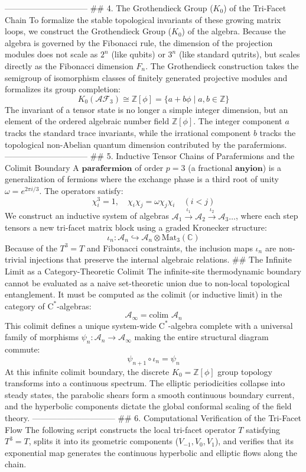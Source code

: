 ------------------------------
## 4. The Grothendieck Group ($K_0$) of the Tri-Facet Chain
To formalize the stable topological invariants of these growing matrix loops, we construct the Grothendieck Group ($K_0$) of the algebra.
Because the algebra is governed by the Fibonacci rule, the dimension of the projection modules does not scale as $2^n$ (like qubits) or $3^n$ (like standard qutrits), but scales directly as the Fibonacci dimension $F_n$.
The Grothendieck construction takes the semigroup of isomorphism classes of finitely generated projective modules and formalizes its group completion:
$$K_0(\mathcal{AF}_3) \cong \mathbb{Z}[\phi] = \{ a + b\phi \mid a, b \in \mathbb{Z} \}$$ 
The invariant of a tensor state is no longer a simple integer dimension, but an element of the ordered algebraic number field $\mathbb{Z}[\phi]$. The integer component $a$ tracks the standard trace invariants, while the irrational component $b$ tracks the topological non-Abelian quantum dimension contributed by the parafermions.
------------------------------
## 5. Inductive Tensor Chains of Parafermions and the Colimit Boundary
A $\textbf{parafermion}$ of order $p=3$ (a fractional $\textbf{anyion}$) is a generalization of fermions where the exchange phase is a third root of unity $\omega = e^{2\pi i / 3}$. The operators satisfy:
$$\chi_i^3 = 1, \quad \chi_i \chi_j = \omega \chi_j \chi_i \quad (i < j)$$ 
We construct an inductive system of algebras $\mathcal{A}_1 \xrightarrow{\iota_1} \mathcal{A}_2 \xrightarrow{\iota_2} \mathcal{A}_3 \dots$, where each step tensors a new tri-facet matrix block using a graded Kronecker structure:
$$\iota_n: \mathcal{A}_n \hookrightarrow \mathcal{A}_n \otimes \text{Mat}_3(\mathbb{C})$$ 
Because of the $T^3=T$ and Fibonacci constraints, the inclusion maps $\iota_n$ are non-trivial injections that preserve the internal algebraic relations.
## The Infinite Limit as a Category-Theoretic Colimit
The infinite-site thermodynamic boundary cannot be evaluated as a naive set-theoretic union due to non-local topological entanglement. It must be computed as the colimit (or inductive limit) in the category of $\text{C}^*$-algebras:
$$\mathcal{A}_\infty = \text{colim } \mathcal{A}_n$$ 
This colimit defines a unique system-wide $\text{C}^*$-algebra complete with a universal family of morphisms $\psi_n: \mathcal{A}_n \to \mathcal{A}_\infty$ making the entire structural diagram commute:
$$\psi_{n+1} \circ \iota_n = \psi_n$$ 
At this infinite colimit boundary, the discrete $K_0 = \mathbb{Z}[\phi]$ group topology transforms into a continuous spectrum. The elliptic periodicities collapse into steady states, the parabolic shears form a smooth continuous boundary current, and the hyperbolic components dictate the global conformal scaling of the field theory.
------------------------------
## 6. Computational Verification of the Tri-Facet Flow
The following script constructs the local tri-facet operator $T$ satisfying $T^3 = T$, splits it into its geometric components ($V_{-1}, V_0, V_1$), and verifies that its exponential map generates the continuous hyperbolic and elliptic flows along the chain.

